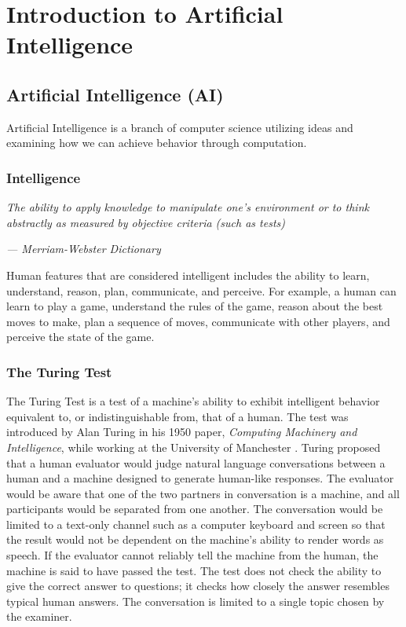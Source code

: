 \chapter{Introduction to Artificial Intelligence}

\section{Artificial Intelligence (AI)}

Artificial Intelligence is a branch of computer science utilizing  ideas and examining how we can achieve  behavior through computation. 

\subsection{Intelligence}

\textit{The ability to apply knowledge to manipulate one's environment or to think abstractly as measured by objective criteria (such as tests)}
\begin{flushright}
    \textit{--- Merriam-Webster Dictionary}
\end{flushright}

Human features that are considered intelligent includes the ability to learn, understand, reason, plan, communicate, and perceive. For example, a human can learn to play a game, understand the rules of the game, reason about the best moves to make, plan a sequence of moves, communicate with other players, and perceive the state of the game.

\subsection{The Turing Test}

The Turing Test is a test of a machine's ability to exhibit intelligent behavior equivalent to, or indistinguishable from, that of a human. The test was introduced by Alan Turing in his 1950 paper, \textit{Computing Machinery and Intelligence}, while working at the University of Manchester \cite{10.1093/mind/LIX.236.433}. Turing proposed that a human evaluator would judge natural language conversations between a human and a machine designed to generate human-like responses. The evaluator would be aware that one of the two partners in conversation is a machine, and all participants would be separated from one another. The conversation would be limited to a text-only channel such as a computer keyboard and screen so that the result would not be dependent on the machine's ability to render words as speech. If the evaluator cannot reliably tell the machine from the human, the machine is said to have passed the test. The test does not check the ability to give the correct answer to questions; it checks how closely the answer resembles typical human answers. The conversation is limited to a single topic chosen by the examiner. 

